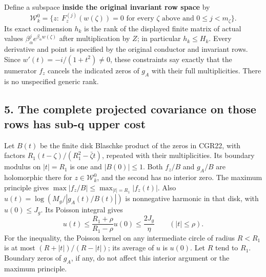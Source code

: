 Define a subspace \textbf{inside the original invariant row space} by \[
\mathcal W_k^0=
\{z:\ F_z^{(j)}(w(\zeta))=0
\text{ for every }\zeta\text{ above and }0\le j<m_\zeta\}.
\tag{CGR23}
\] Its exact codimension \(h_k\) is the rank of the displayed finite matrix of actual values \(\beta_\alpha^j e^{\beta_\alpha w(\zeta)}\) after multiplication by \(Z\); in particular \(h_k\le H_k\). Every derivative and point is specified by the original conductor and invariant rows. Since \(w'(t)=-i/(1+t^2)\ne0\), these constraints say exactly that the numerator \(f_z\) cancels the indicated zeros of \(g_A\) with their full multiplicities. There is no unspecified generic rank.

\subsection{5. The complete projected covariance on those rows has sub-q upper cost}\label{the-complete-projected-covariance-on-those-rows-has-sub-q-upper-cost}

Let \(B(t)\) be the finite disk Blaschke product of the zeros in CGR22, with factors \(R_1(t-\zeta)/(R_1^2-\bar\zeta t)\), repeated with their multiplicities. Its boundary modulus on \(|t|=R_1\) is one and \(|B(0)|\le1\). Both \(f_z/B\) and \(g_A/B\) are holomorphic there for \(z\in\mathcal W_k^0\), and the second has no interior zero. The maximum principle gives \(\max|f_z/B|\le\max_{|t|=R_1}|f_z(t)|\). Also \(u(t)=\log(M_g/|g_A(t)/B(t)|)\) is nonnegative harmonic in that disk, with \(u(0)\le J_g\). Its Poisson integral gives \[
u(t)\le\frac{R_1+\rho}{R_1-\rho}u(0)
\le\frac{2J_g}{\eta}\qquad(|t|\le\rho).
\tag{CGR24}
\] For the inequality, the Poisson kernel on any intermediate circle of radius \(R< R_1\) is at most \((R+|t|)/(R-|t|)\); its average of \(u\) is \(u(0)\). Let \(R\) tend to \(R_1\). Boundary zeros of \(g_A\), if any, do not affect this interior argument or the maximum principle.

